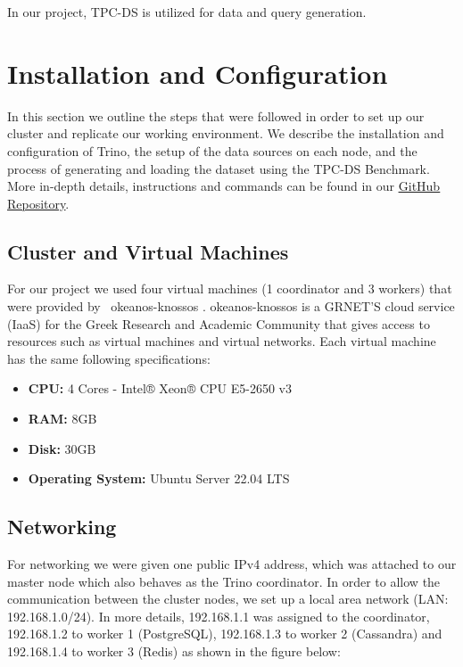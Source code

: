 \documentclass[conference]{IEEEtran}
\begin{document}
In our project, TPC-DS is utilized for data and query generation.

\section{Installation and Configuration}

In this section we outline the steps that were followed in order to set up our cluster and replicate our working
environment. We describe the installation and configuration of Trino, the setup of the data sources
on each node, and the process of generating and loading the dataset using the TPC-DS Benchmark.
More in-depth details, instructions and commands can be found in our \textcolor{linkblue}{\underline{\href{https://github.com/alex1on/Information-Systems-NTUA}{GitHub Repository}}}.
\subsection{Cluster and Virtual Machines}
\label{sec:cluster-and-virtual-machines}

For our project we used four virtual machines (1 coordinator and 3 workers) that were provided by ~okeanos-knossos \cite{b10}.
okeanos-knossos is a GRNET'S cloud service (IaaS) for the Greek Research and Academic Community that gives access to resources such as
virtual machines and virtual networks. Each virtual machine has the same following specifications:

\begin{itemize}
    \item \textbf{CPU:} 4 Cores - Intel® Xeon® CPU E5-2650 v3
    \item \textbf{RAM:} 8GB
    \item \textbf{Disk:} 30GB
    \item \textbf{Operating System:} Ubuntu Server 22.04 LTS
\end{itemize}

\subsection{Networking}

For networking we were given one public IPv4 address, which was attached to our master node which also behaves as the Trino coordinator.
In order to allow the communication between the cluster nodes, we set up a local area network (LAN: 192.168.1.0/24). In more details,
192.168.1.1 was assigned to the coordinator, 192.168.1.2 to worker 1 (PostgreSQL), 192.168.1.3 to worker 2 (Cassandra) and 192.168.1.4 to worker 3 (Redis)
as shown in the figure below:
\end{document}
